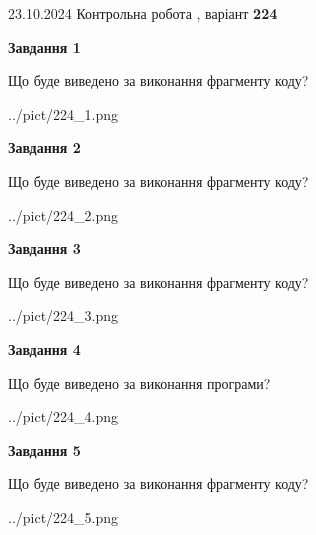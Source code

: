 \documentclass[12pt, ukrainian]{article}
\begin{document}
{\Large{23.10.2024 Контрольна робота , варіант  \No \textbf { 224 }\par}}
{
\begin {large}
{\begin {center}\textbf{Завдання 1}\end {center}}

Що буде виведено за виконання фрагменту коду?\par
\begin{center}
	{../pict/224_1.png}
\end{center}
\newpage

{\begin {center}\textbf{Завдання 2}\end {center}}

Що буде виведено за виконання фрагменту коду?\par
\begin{center}
	{../pict/224_2.png}
\end{center}
\newpage

{\begin {center}\textbf{Завдання 3}\end {center}}

Що буде виведено за виконання фрагменту коду?\par
\begin{center}
	{../pict/224_3.png}
\end{center}
\newpage

{\begin {center}\textbf{Завдання 4}\end {center}}

Що буде виведено за виконання програми?\par
\begin{center}
	{../pict/224_4.png}
\end{center}
\newpage

{\begin {center}\textbf{Завдання 5}\end {center}}

Що буде виведено за виконання фрагменту коду?\par
\begin{center}
	{../pict/224_5.png}
\end{center}
\newpage


\end{large}}
\end{document}
